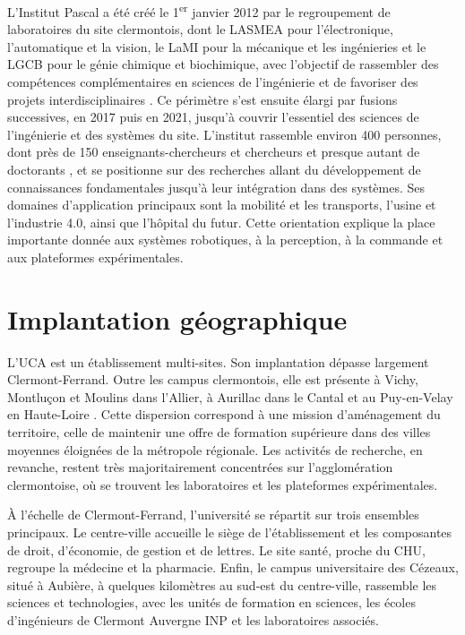 \documentclass[a4paper,11pt]{report}
\begin{document}
L'Institut Pascal a été créé le 1\textsuperscript{er} janvier 2012 par le regroupement de laboratoires du site clermontois, dont le LASMEA pour l'électronique, l'automatique et la vision, le LaMI pour la mécanique et les ingénieries et le LGCB pour le génie chimique et biochimique, avec l'objectif de rassembler des compétences complémentaires en sciences de l'ingénierie et de favoriser des projets interdisciplinaires \cite{institut-pascal}. Ce périmètre s'est ensuite élargi par fusions successives, en 2017 puis en 2021, jusqu'à couvrir l'essentiel des sciences de l'ingénierie et des systèmes du site. L'institut rassemble environ 400 personnes, dont près de 150 enseignants-chercheurs et chercheurs et presque autant de doctorants \cite{institut-pascal}, et se positionne sur des recherches allant du développement de connaissances fondamentales jusqu'à leur intégration dans des systèmes. Ses domaines d'application principaux sont la mobilité et les transports, l'usine et l'industrie 4.0, ainsi que l'hôpital du futur. Cette orientation explique la place importante donnée aux systèmes robotiques, à la perception, à la commande et aux plateformes expérimentales.

\section{Implantation géographique}
\label{sec:implantation}

L'UCA est un établissement multi-sites. Son implantation dépasse largement Clermont-Ferrand. Outre les campus clermontois, elle est présente à Vichy, Montluçon et Moulins dans l'Allier, à Aurillac dans le Cantal et au Puy-en-Velay en Haute-Loire \cite{uca-universite}. Cette dispersion correspond à une mission d'aménagement du territoire, celle de maintenir une offre de formation supérieure dans des villes moyennes éloignées de la métropole régionale. Les activités de recherche, en revanche, restent très majoritairement concentrées sur l'agglomération clermontoise, où se trouvent les laboratoires et les plateformes expérimentales.

À l'échelle de Clermont-Ferrand, l'université se répartit sur trois ensembles principaux. Le centre-ville accueille le siège de l'établissement et les composantes de droit, d'économie, de gestion et de lettres. Le site santé, proche du CHU, regroupe la médecine et la pharmacie. Enfin, le campus universitaire des Cézeaux, situé à Aubière, à quelques kilomètres au sud-est du centre-ville, rassemble les sciences et technologies, avec les unités de formation en sciences, les écoles d'ingénieurs de Clermont Auvergne INP et les laboratoires associés.
\end{document}
